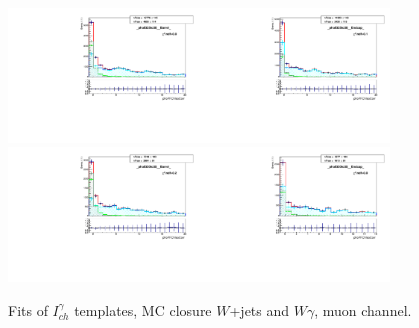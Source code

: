 \begin{figure}[htb]
\begin{center}
   \includegraphics[width=0.45\textwidth]{../figs/figs_v11/MUON_WGamma/MCclosureWjetsPlusWg/c_TEMPL_CHISO_UNblind__phoEt25to30__Barrel__RooFit_MCclosure.pdf}\includegraphics[width=0.45\textwidth]{../figs/figs_v11/MUON_WGamma/MCclosureWjetsPlusWg/c_TEMPL_CHISO_UNblind__phoEt25to30__Endcap__RooFit_MCclosure.pdf}\\
   \includegraphics[width=0.45\textwidth]{../figs/figs_v11/MUON_WGamma/MCclosureWjetsPlusWg/c_TEMPL_CHISO_UNblind__phoEt30to35__Barrel__RooFit_MCclosure.pdf}\includegraphics[width=0.45\textwidth]{../figs/figs_v11/MUON_WGamma/MCclosureWjetsPlusWg/c_TEMPL_CHISO_UNblind__phoEt30to35__Endcap__RooFit_MCclosure.pdf}\\
  \label{fig:templateFits_MCclosureWjetsPlusWg_CHISO_MUON_1}
  \caption{Fits of $I_{ch}^{\gamma}$ templates, MC closure $W$+jets and $W\gamma$, muon channel.}
  \end{center}
\end{figure}


